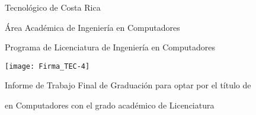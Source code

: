 {}

\thispagestyle{empty} 

\begin{center}

Tecnológico de Costa Rica

\par\vspace{1ex}

Área Académica de Ingeniería en Computadores

\par\vspace{1ex}

Programa de Licenciatura de Ingeniería en Computadores

\par\vspace{20mm}

\texttt{[image: Firma\_TEC-4]}

\par\vspace*{\fill}

{\large\bf{\thesisTitle}\par}

\par\vspace*{\fill}

Informe de Trabajo Final de Graduación para optar por el título de

\thesisAuthorDegree{} en Computadores con el grado académico de Licenciatura

\par\vspace{20mm}

\thesisAuthor

\vspace*{\fill}

\end{center}
\newpage 
\cleardoublepage 


